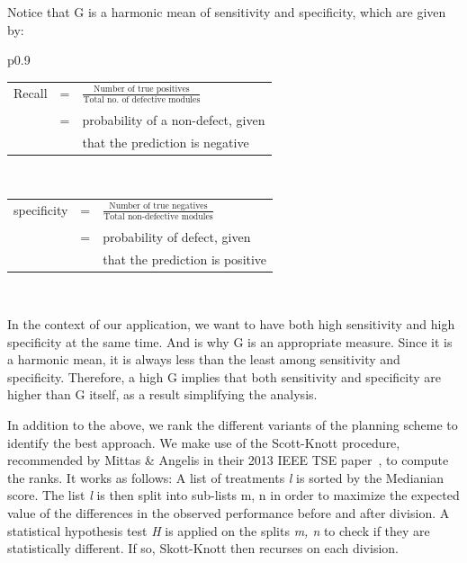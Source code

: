 \documentclass[12pt]{IEEEtran}
\begin{document}
Notice that G is a harmonic mean of sensitivity and specificity, which are given by:

\noindent\begin{tabular}{p{0.9\linewidth}}
\centering
\begin{tabular}{lll}
Recall& = &{\Large $\frac{\text{Number of true positives}}{\text{Total no. of defective modules}}$}\\
&&\\
& = & probability of a non-defect, given \\
& & that the prediction is negative
\end{tabular}\\[1.25cm]

\begin{tabular}{lll}
	
	specificity& = &{\Large $\frac{\text{Number of true negatives}}{\text{Total non-defective modules}}$}\\
	&&\\
	& = & probability of defect, given \\
	& & that the prediction is positive \\
\end{tabular}\\
\end{tabular}
	
%
%

In the context of our application, we want to have both high sensitivity and high specificity at the same time. And is why G is an appropriate measure. Since it is a harmonic mean, it is always less than the least among sensitivity and specificity. Therefore, a high G implies that both sensitivity and specificity are higher than G itself, as a result simplifying the analysis.

In addition to the above, we rank the different variants of the planning scheme to identify the best approach. We make use of the Scott-Knott procedure, recommended by Mittas \& Angelis in their 2013 IEEE TSE paper~\cite{sk}, to compute the ranks. It works as follows: A list of treatments \textit{l} is sorted by the Medianian score. The list \textit{l} is then split into sub-lists m, n in order to maximize the expected value of the differences in the observed performance before and after division. A statistical hypothesis test \textit{H} is applied on the splits \textit{m, n} to check if they are statistically different. If so, Skott-Knott then recurses on each division. 
\end{document}
